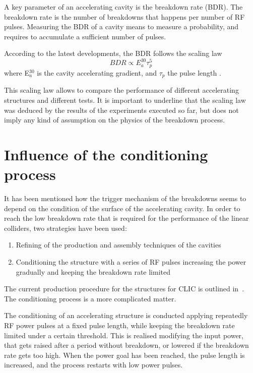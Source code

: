  A key parameter of an accelerating cavity is the breakdown rate (BDR). The breakdown rate is the number of breakdowns that happens per number of RF pulses. Measuring the BDR of a cavity means to measure a probability, and requires to accumulate a sufficient number of pulses. 

According to the latest developments, the BDR follows the scaling law
\begin{equation}
BDR \propto E^{30}_a \tau^5_p 
\end{equation}
where E$^{30}_a$ is the cavity accelerating gradient, and $\tau_p$ the pulse length  \cite{Wuensch:advaces}.

This scaling law allows to compare the performance of different accelerating structures and different tests. It is important to underline that the scaling law was deduced by the results of the experiments executed so far, but does not imply any kind of assumption on the physics of the breakdown process.




\section[Influence of the conditioning process]{Influence of the conditioning process}
\label{sec:conditioning}

It has been mentioned how the trigger mechanism of the breakdowns seems to depend on the condition of the surface of the accelerating cavity. In order to reach the low breakdown rate that is required for the performance of the linear colliders, two strategies have been used:
\begin{enumerate}
\item Refining of the production and assembly techniques of the cavities
\item Conditioning the structure with a series of RF pulses increasing the power gradually and keeping the breakdown rate limited
\end{enumerate}
The current production procedure for the structures for CLIC is outlined in~\cite{CLIC:cdr}. The conditioning process is a more complicated matter. 

The conditioning of an accelerating structure is conducted applying repeatedly RF power pulses at a fixed pulse length, while keeping the breakdown rate limited under a certain threshold. This is realised modifying the input power, that gets raised after a period without breakdown, or lowered if the breakdown rate gets too high. When the power goal has been reached, the pulse length is increased, and the process restarts with low power pulses.

